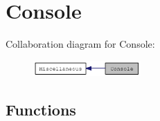 \hypertarget{group__console}{
\section{Console}
\label{group__console}
}


Collaboration diagram for Console:\nopagebreak
\begin{figure}[H]
\begin{center}
\leavevmode
\includegraphics[width=116pt]{group__console}
\end{center}
\end{figure}
\subsection*{Functions}
